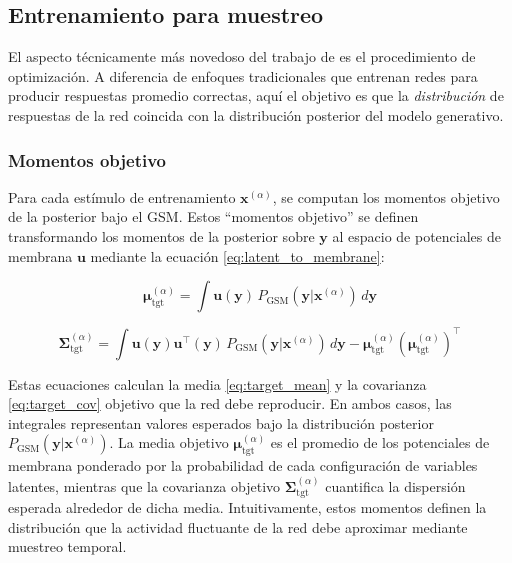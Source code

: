 \subsection{Entrenamiento para muestreo}
\label{subsec:echeveste_entrenamiento}

El aspecto técnicamente más novedoso del trabajo de \citeauthor{echeveste2020cortical} es el procedimiento de optimización. A diferencia de enfoques tradicionales que entrenan redes para producir respuestas promedio correctas, aquí el objetivo es que la \textit{distribución} de respuestas de la red coincida con la distribución posterior del modelo generativo.

\subsubsection{Momentos objetivo}

Para cada estímulo de entrenamiento $\mathbf{x}^{(\alpha)}$, se computan los momentos objetivo de la posterior bajo el \acrshort{GSM}. Estos ``momentos objetivo'' se definen transformando los momentos de la posterior sobre $\mathbf{y}$ al espacio de potenciales de membrana $\mathbf{u}$ mediante la ecuación \ref{eq:latent_to_membrane}:

\begin{equation}
\boldsymbol{\mu}_{\text{tgt}}^{(\alpha)} = \int \mathbf{u}(\mathbf{y}) \, P_{\text{GSM}}(\mathbf{y}|\mathbf{x}^{(\alpha)}) \, d\mathbf{y}
\label{eq:target_mean}
\end{equation}

\begin{equation}
\boldsymbol{\Sigma}_{\text{tgt}}^{(\alpha)} = \int \mathbf{u}(\mathbf{y}) \mathbf{u}^\top(\mathbf{y}) \, P_{\text{GSM}}(\mathbf{y}|\mathbf{x}^{(\alpha)}) \, d\mathbf{y} - \boldsymbol{\mu}_{\text{tgt}}^{(\alpha)} (\boldsymbol{\mu}_{\text{tgt}}^{(\alpha)})^\top
\label{eq:target_cov}
\end{equation}

Estas ecuaciones calculan la media \eqref{eq:target_mean} y la covarianza \eqref{eq:target_cov} objetivo que la red debe reproducir. En ambos casos, las integrales representan valores esperados bajo la distribución posterior $P_{\text{GSM}}(\mathbf{y}|\mathbf{x}^{(\alpha)})$.
La media objetivo $\boldsymbol{\mu}_{\text{tgt}}^{(\alpha)}$ es el promedio de los potenciales de membrana ponderado por la probabilidad de cada configuración de variables latentes, mientras que la covarianza objetivo $\boldsymbol{\Sigma}_{\text{tgt}}^{(\alpha)}$ cuantifica la dispersión esperada alrededor de dicha media. Intuitivamente, estos momentos definen la distribución que la actividad fluctuante de la red debe aproximar mediante muestreo temporal.

